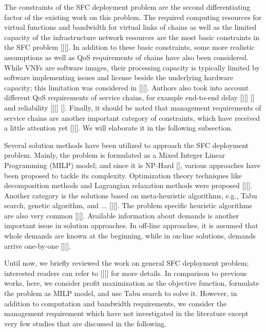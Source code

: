 The constraints of the SFC deployment problem are the second differentiating factor of the existing work on this problem. The required computing resources for virtual functions and bandwidth for virtual links of chains as well as the limited capacity of the infrastructure network resources are the most basic constraints in the SFC problem [][]. In addition to these basic constraints, some more realistic assumptions as well as QoS requirements of chains have also been considered. While VNFs are software images, their processing capacity is typically limited by software implementing issues and license beside the underlying hardware capacity; this  limitation was considered in [][]. Authors also took into account different QoS requirements of service chains, for example end-to-end delay [][] [] and reliability [][] []. Finally, it should be noted that management requirements of service chains are another important category of constraints, which have received a little attention yet [][]. We will elaborate it in the following subsection.  

Several solution methods have been utilized to approach the SFC deployment problem. Mainly, the problem is formulated as a Mixed Integer Linear Programming (MILP) model; and since it is NP-Hard [], various approaches have been proposed to tackle its complexity. Optimization theory techniques like decomposition methods and Lagrangian relaxation methods were proposed [][]. Another category is the solutions based on meta-heuristic algorithms, e.g., Tabu search, genetic algorithm, and ... [][]. The problem specific heuristic algorithms are also very common [][]. Available information about demands is another important issue in solution approaches. In off-line approaches, it is assumed that whole demands are known at the beginning, while in on-line solutions, demands arrive one-by-one [][].

Until now, we briefly reviewed the work on general SFC deployment problem; interested readers can refer to [][] for more details. In comparison to previous works, here, we consider profit maximization as the objective function, formulate the problem as MILP model, and use Tabu search to solve it. However, in addition to computation and bandwidth requirements, we consider the management requirement which have not investigated in the literature except very few studies that are discussed in the following. 


